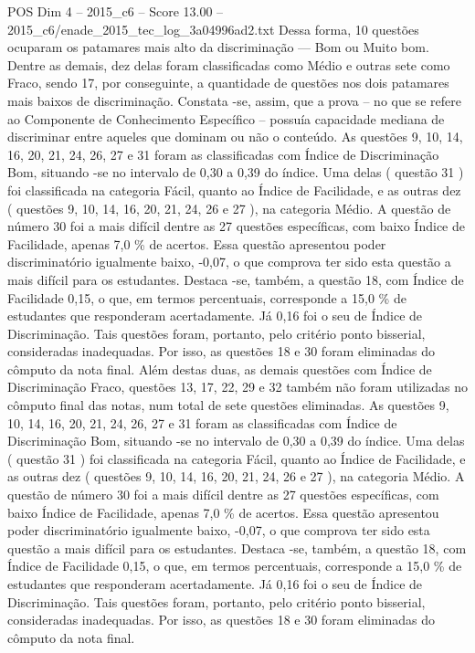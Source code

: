 \begin{textsample}{POS Dim 4 – 2015\_c6 – Score 13.00 – 2015\_c6/enade\_2015\_tec\_log\_3a04996ad2.txt}
Dessa forma, 10 questões ocuparam os patamares mais alto da discriminação — Bom ou Muito bom.
Dentre as demais, dez delas foram classificadas como Médio e outras sete como Fraco, sendo 17, por conseguinte, a quantidade de questões nos dois patamares mais baixos de discriminação.
Constata -se, assim, que a prova – no que se refere ao Componente de Conhecimento Específico – possuía capacidade mediana de discriminar entre aqueles que dominam ou não o conteúdo.
As questões 9, 10, 14, 16, 20, 21, 24, 26, 27 e 31 foram as classificadas com Índice de Discriminação Bom, situando -se no intervalo de 0,30 a 0,39 do índice.
Uma delas ( questão 31 ) foi classificada na categoria Fácil, quanto ao Índice de Facilidade, e as outras dez ( questões 9, 10, 14, 16, 20, 21, 24, 26 e 27 ), na categoria Médio.
A questão de número 30 foi a mais difícil dentre as 27 questões específicas, com baixo Índice de Facilidade, apenas 7,0 \% de acertos.
Essa questão apresentou poder discriminatório igualmente baixo, -0,07, o que comprova ter sido esta questão a mais difícil para os estudantes.
Destaca -se, também, a questão 18, com Índice de Facilidade 0,15, o que, em termos percentuais, corresponde a 15,0 \% de estudantes que responderam acertadamente.
Já 0,16 foi o seu de Índice de Discriminação.
Tais questões foram, portanto, pelo critério ponto bisserial, consideradas inadequadas.
Por isso, as questões 18 e 30 foram eliminadas do cômputo da nota final.
Além destas duas, as demais questões com Índice de Discriminação Fraco, questões 13, 17, 22, 29 e 32 também não foram utilizadas no cômputo final das notas, num total de sete questões eliminadas.
As questões 9, 10, 14, 16, 20, 21, 24, 26, 27 e 31 foram as classificadas com Índice de Discriminação Bom, situando -se no intervalo de 0,30 a 0,39 do índice.
Uma delas ( questão 31 ) foi classificada na categoria Fácil, quanto ao Índice de Facilidade, e as outras dez ( questões 9, 10, 14, 16, 20, 21, 24, 26 e 27 ), na categoria Médio.
A questão de número 30 foi a mais difícil dentre as 27 questões específicas, com baixo Índice de Facilidade, apenas 7,0 \% de acertos.
Essa questão apresentou poder discriminatório igualmente baixo, -0,07, o que comprova ter sido esta questão a mais difícil para os estudantes.
Destaca -se, também, a questão 18, com Índice de Facilidade 0,15, o que, em termos percentuais, corresponde a 15,0 \% de estudantes que responderam acertadamente.
Já 0,16 foi o seu de Índice de Discriminação.
Tais questões foram, portanto, pelo critério ponto bisserial, consideradas inadequadas.
Por isso, as questões 18 e 30 foram eliminadas do cômputo da nota final.

\end{textsample}

